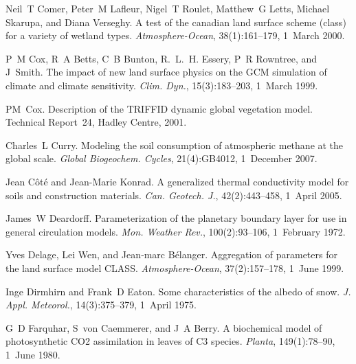 \begin{DoxyDescription}
\item[\label{_CITEREF_Comer2000-mz}%
\mbox{[}24\mbox{]}]Neil~T Comer, Peter~M Lafleur, Nigel~T Roulet, Matthew~G Letts, Michael Skarupa, and Diana Verseghy. A test of the canadian land surface scheme (class) for a variety of wetland types. {\itshape Atmosphere-\/\+Ocean}, 38(1)\+:161--179, 1~March 2000. 


\item[\label{_CITEREF_Cox1999-ia}%
\mbox{[}25\mbox{]}]P~M Cox, R~A Betts, C~B Bunton, R.~L.~H. Essery, P~R Rowntree, and J~Smith. The impact of new land surface physics on the G\+C\+M simulation of climate and climate sensitivity. {\itshape Clim. Dyn.}, 15(3)\+:183--203, 1~March 1999. 


\item[\label{_CITEREF_Cox2001-am}%
\mbox{[}26\mbox{]}]P\+M~Cox. Description of the T\+R\+I\+F\+F\+I\+D dynamic global vegetation model. Technical Report~24, Hadley Centre, 2001.


\item[\label{_CITEREF_Curry2007-du}%
\mbox{[}27\mbox{]}]Charles~L Curry. Modeling the soil consumption of atmospheric methane at the global scale. {\itshape Global Biogeochem. Cycles}, 21(4)\+:G\+B4012, 1~December 2007. 


\item[\label{_CITEREF_Cote2005-ew}%
\mbox{[}28\mbox{]}]Jean Côté and Jean-\/\+Marie Konrad. A generalized thermal conductivity model for soils and construction materials. {\itshape Can. Geotech. J.}, 42(2)\+:443--458, 1~April 2005. 


\item[\label{_CITEREF_Deardorff1972-ay}%
\mbox{[}29\mbox{]}]James~W Deardorff. Parameterization of the planetary boundary layer for use in general circulation models. {\itshape Mon. Weather Rev.}, 100(2)\+:93--106, 1~February 1972. 


\item[\label{_CITEREF_Delage1999-vj}%
\mbox{[}30\mbox{]}]Yves Delage, Lei Wen, and Jean‐marc Bélanger. Aggregation of parameters for the land surface model C\+L\+A\+S\+S. {\itshape Atmosphere-\/\+Ocean}, 37(2)\+:157--178, 1~June 1999. 


\item[\label{_CITEREF_Dirmhirn1975-vx}%
\mbox{[}31\mbox{]}]Inge Dirmhirn and Frank~D Eaton. Some characteristics of the albedo of snow. {\itshape J. Appl. Meteorol.}, 14(3)\+:375--379, 1~April 1975. 


\item[\label{_CITEREF_Farquhar1980-96e}%
\mbox{[}32\mbox{]}]G~D Farquhar, S~von Caemmerer, and J~A Berry. A biochemical model of photosynthetic C\+O2 assimilation in leaves of C3 species. {\itshape Planta}, 149(1)\+:78--90, 1~June 1980. 



\end{DoxyDescription}
